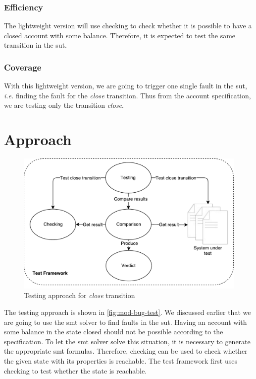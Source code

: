 \subsubsection{Efficiency}
The lightweight version will use checking to check whether it is possible to have
a closed account with some balance. Therefore, it is expected to test the same
transition in the \gls{sut}.

\subsubsection{Coverage}
With this lightweight version, we are going to trigger one single fault in the \gls{sut},
\textit{i.e.} finding the fault for the \textit{close} transition. Thus from the
account specification, we are testing only the transition \textit{close}.

\section{Approach}

\begin{figure}[h!]
  \centering
  \includegraphics[width=\linewidth{}]{figures/test-modified-bug.pdf}
  \caption{Testing approach for \textit{close} transition}\label{fig:mod-bug-test}
\end{figure}
\FloatBarrier

The testing approach is shown in \autoref{fig:mod-bug-test}.
We discussed earlier that we are going to use the \gls{smt} solver to find faults in the
\gls{sut}. Having an account with some balance in the state closed should not be possible
according to the specification. To let the \gls{smt} solver solve this situation, it
is necessary to generate the appropriate \gls{smt} formulas. Therefore, checking can
be used to check whether the given state with its properties is reachable.
The test framework first uses checking to test whether the state is reachable.

